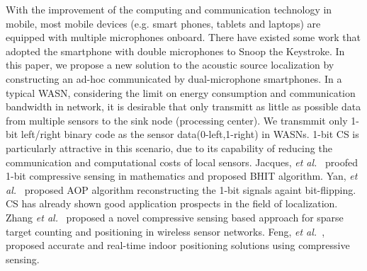 With the improvement of the computing and communication technology in mobile, most mobile devices (e.g. smart phones,
tablets and laptops) are equipped with multiple microphones
onboard. 
There have existed some work that adopted the smartphone with double microphones to Snoop the Keystroke\cite{zhu2014context,Liusnooping}. 
In this paper, we propose a new solution to
the acoustic source localization by constructing an ad-hoc communicated by dual-microphone
smartphones. 
In a typical WASN, considering the limit on energy consumption and communication bandwidth in network, 
it is desirable that only transmitt as little as possible data from multiple sensors to the sink node (processing 
center). 
We transmmit only 1-
bit left/right binary code as the sensor data(0-left,1-right) in
WASNs. 
1-bit CS is particularly attractive in this scenario, due to its capability of reducing the communication and computational costs of local sensors. Jacques, \emph{et al.}~\cite{Laska2013Robust} proofed 1-bit compressive sensing in mathematics and proposed  BHIT algorithm. Yan, \emph{et al.}~\cite{Yan2012}  proposed AOP algorithm reconstructing the 1-bit signals againt bit-flipping.
CS has already shown good application prospects in the field of localization.
Zhang \emph{et al.}~\cite{zhang2011sparse} proposed a novel compressive sensing based approach for sparse target counting and positioning in wireless sensor networks. Feng, \emph{et al.}~\cite{feng2010compressive},~\cite{feng2012received} proposed accurate and real-time indoor positioning solutions using compressive sensing. 






